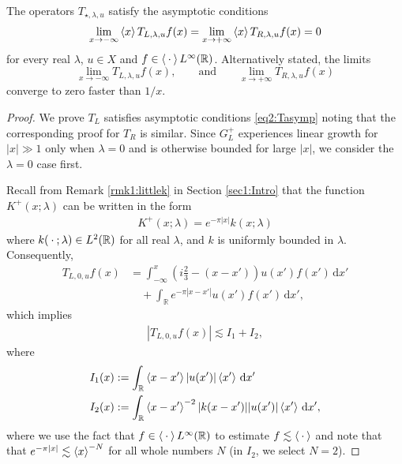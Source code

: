 \documentclass[../dissertation]{subfiles}
\begin{document}
\begin{prop}\label{prop2:Tasymp}
	The operators $T_{\star, \lambda, u}$ satisfy the asymptotic conditions 
	\begin{align}\label{eq2:Tasymp}
		\lim_{x\to-\infty} \left\langle x \right\rangle T_{L, \lambda, u} f(x) 
			= \lim_{x\to+\infty} \left\langle x \right\rangle T_{R, \lambda, u} f(x) 
			= 0
	\end{align}
	for every real $\lambda$, $u\in X$ and $f\in \left\langle \kern 0.5ex \cdot \kern 0.5ex \right\rangle L^\infty(\mathbb R)$. 
	Alternatively stated, the limits
	\[
		\lim_{x\to-\infty} T_{L, \lambda, u} f(x), 
		\qquad \text{and} \qquad 
		\lim_{x\to+\infty} T_{R, \lambda, u} f(x) 
	\]
	converge to zero faster than $1/x$.
\end{prop}
\begin{proof}
	We prove $T_L$ satisfies asymptotic conditions \eqref{eq2:Tasymp} noting 
	that the corresponding proof for $T_R$ is similar. Since $G_L^+$ experiences
	linear growth for $|x|\gg 1$ only when $\lambda = 0$ and is otherwise bounded
	for large $|x|$, we consider the $\lambda = 0$ case first.

	Recall from Remark \ref{rmk1:littlek} in Section \ref{sec1:Intro} that
	the function $K^+(x; \lambda)$ can be written in the form
	\begin{align}
		K^+(x; \lambda) = e^{-\pi |x|}k(x; \lambda)
	\end{align}
	where $k(\kern 0.5ex \cdot \kern 0.5ex; \lambda) \in L^2(\mathbb R)$ for all real $\lambda$, and 
	$k$ is uniformly bounded in $\lambda$. Consequently, 
	\begin{align*}
		T_{L,0,u} f(x)
			&= 
				\int_{-\infty}^x 
					\left(i \frac{2}{3} - (x-x')\right)
					u(x') f(x') \, \mathrm{d}x' \\
			&\quad+ \int_{\mathbb R} e^{-\pi|x-x'|} u(x') f(x')\, \mathrm{d}x',
	\end{align*}
	which implies
	\begin{align*}
		|T_{L,0,u} f(x)|
			\lesssim I_1 + I_2,
	\end{align*}
	where
	\begin{align*}
		I_1(x) &:= \int_{\mathbb R} \left\langle x-x' \right\rangle |u(x')|\left\langle x' \right\rangle\, \mathrm{d}x' \\
		I_2(x) &:= \int_{\mathbb R} \left\langle x-x' \right\rangle^{-2} |k(x-x')| |u(x')|\left\langle x' \right\rangle\, \mathrm{d}x',
	\end{align*}
	where we use the fact that $f\in \left\langle \kern 0.5ex \cdot \kern 0.5ex \right\rangle L^\infty(\mathbb R)$ to estimate
	$f \lesssim \left\langle \kern 0.5ex \cdot \kern 0.5ex \right\rangle$ and note that that $e^{-\pi|x|} \lesssim \left\langle x \right\rangle^{-N}$
	for all whole numbers $N$ (in $I_2$, we select $N=2$). 
	

\end{proof}
\end{document}
